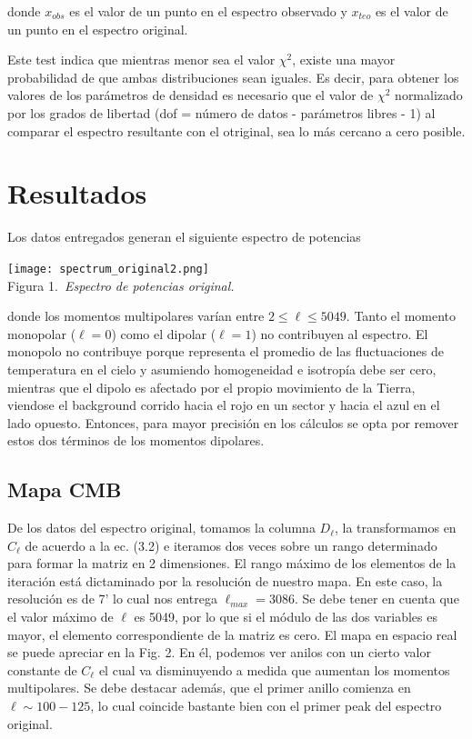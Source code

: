 \documentclass[twocolumn,letterpaper,spanish]{revtex4}
\numberwithin{equation}{section}
\begin{document}
donde $x_{obs}$ es el valor de un punto en el espectro observado y $x_{teo}$ es el valor de un punto en el espectro original.

Este test indica que mientras menor sea el valor $\chi^2$, existe una mayor probabilidad de que ambas distribuciones sean iguales. Es decir, para obtener los valores de los par\'ametros de densidad es necesario que el valor de $\chi^2$ normalizado por los grados de libertad (dof = n\'umero de datos - par\'ametros libres - 1) al comparar el espectro resultante con el otriginal, sea lo m\'as cercano a cero posible.


\section{Resultados}\label{resultados}

Los datos entregados generan el siguiente espectro de potencias

\begin{center}
   \texttt{[image: spectrum\_original2.png]}\\
   Figura 1.\emph{\ Espectro de potencias original.}
\end{center}
donde los momentos multipolares var\'ian entre $2\leq\ell\leq 5049$. Tanto el momento monopolar ($\ell=0$) como el dipolar ($\ell=1$) no contribuyen al espectro. El monopolo no contribuye porque representa el promedio de las fluctuaciones de temperatura en el cielo y asumiendo homogeneidad e isotrop\'ia debe ser cero, mientras que el dipolo es afectado por el propio movimiento de la Tierra, viendose el background corrido hacia el rojo en un sector y hacia el azul en el lado opuesto. Entonces, para mayor precisi\'on en los c\'alculos se opta por remover estos dos t\'erminos de los momentos dipolares.


\subsection{Mapa CMB}

De los datos del espectro original, tomamos la columna $D_{\ell}$, la transformamos en $C_{\ell}$ de acuerdo a la ec. (3.2) e iteramos dos veces sobre un rango determinado para formar la matriz en 2 dimensiones. El rango m\'aximo de los elementos de la iteraci\'on est\'a dictaminado por la resoluci\'on de nuestro mapa. En este caso, la resoluci\'on es de 7' lo cual nos entrega $\ell_{max}=3086$. Se debe tener en cuenta que el valor m\'aximo de $\ell$ es 5049, por lo que si el m\'odulo de las dos variables es mayor, el elemento correspondiente de la matriz es cero. El mapa en espacio real se puede apreciar en la Fig. 2. En \'el, podemos ver anilos con un cierto valor constante de $C_{\ell}$ el cual va disminuyendo a medida que aumentan los momentos multipolares.
Se debe destacar adem\'as, que el primer anillo comienza en $\ell\sim 100-125$, lo cual coincide bastante bien con el primer peak del espectro original.
\end{document}
